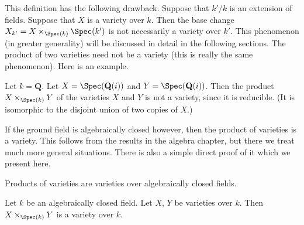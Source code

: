 \noindent
This definition has the following drawback. Suppose that
$k'/k$ is an extension of fields. Suppose that $X$
is a variety over $k$. Then the base change
$X_{k'} = X \times_{\Spec(k)} \Spec(k')$ is
not necessarily a variety over $k'$. This phenomenon (in greater
generality) will be discussed in detail in the following sections.
The product of two varieties need not be a variety
(this is really the same phenomenon). Here is an example.

\begin{example}
\label{example-product-not-a-variety}
Let $k = \mathbf{Q}$. Let $X = \Spec(\mathbf{Q}(i))$
and $Y = \Spec(\mathbf{Q}(i))$. Then the product
$X \times_{\Spec(k)} Y$ of the varieties $X$ and $Y$
is not a variety, since it is reducible. (It is isomorphic
to the disjoint union of two copies of $X$.)
\end{example}

\noindent
If the ground field is algebraically closed however, then the
product of varieties is a variety. This follows from the results
in the algebra chapter, but there we treat much more general situations.
There is also a simple direct proof of it which we present here.

\begin{lemma}
\label{lemma-product-varieties}
\begin{slogan}
Products of varieties are varieties over algebraically closed fields.
\end{slogan}
Let $k$ be an algebraically closed field.
Let $X$, $Y$ be varieties over $k$.
Then $X \times_{\Spec(k)} Y$ is a variety over $k$.
\end{lemma}

